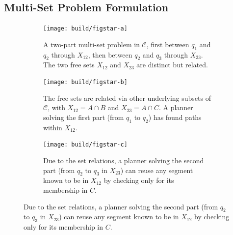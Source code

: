 \subsection{Multi-Set Problem Formulation}
\label{sec:multi-set}

\begin{figure}
\begin{widepage}
\centering

\begin{subfigure}[t]{.32\linewidth}
\centering
\texttt{[image: build/figstar-a]}
\caption{A two-part multi-set problem in $\mathcal{C}$,
  first between $q_1$ and $q_2$ through $X_{12}$,
  then between $q_2$ and $q_3$ through $X_{23}$.
  The two free sets $X_{12}$ and $X_{23}$ are distinct
  but related.}
\end{subfigure}%
\quad%
\begin{subfigure}[t]{.32\linewidth}
\centering
\texttt{[image: build/figstar-b]}
\caption{The free sets are related via other underlying
  subsets of $\mathcal{C}$, with $X_{12}=A \cap B$
  and $X_{23}=A \cap C$.
  A planner solving the first part (from $q_1$ to $q_2$)
  has found paths within $X_{12}$.}
\label{subfig:figstar-intersections}
\end{subfigure}%
\quad%
\begin{subfigure}[t]{.32\linewidth}
\centering
\texttt{[image: build/figstar-c]}
\caption{Due to the set relations,
  a planner solving the second part
  (from $q_2$ to $q_3$ in $X_{23}$)
  can reuse any segment known to be in $X_{12}$
  by checking only for its membership in $C$.}
\end{subfigure}

\vspace{0.1in}


\end{widepage}
\end{figure}
